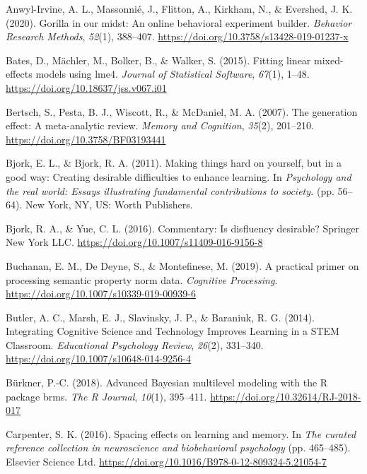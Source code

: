 \documentclass[english,pdf]{apa6}
\begin{document}
\begingroup
\setlength{\parindent}{-0.5in}
\setlength{\leftskip}{0.5in}

\hypertarget{refs}{}
\leavevmode\hypertarget{ref-Anwyl-Irvine2020}{}%
Anwyl-Irvine, A. L., Massonnié, J., Flitton, A., Kirkham, N., \& Evershed, J. K. (2020). Gorilla in our midst: An online behavioral experiment builder. \emph{Behavior Research Methods}, \emph{52}(1), 388--407. \url{https://doi.org/10.3758/s13428-019-01237-x}

\leavevmode\hypertarget{ref-Bates2015}{}%
Bates, D., Mächler, M., Bolker, B., \& Walker, S. (2015). Fitting linear mixed-effects models using lme4. \emph{Journal of Statistical Software}, \emph{67}(1), 1--48. \url{https://doi.org/10.18637/jss.v067.i01}

\leavevmode\hypertarget{ref-Bertsch2007}{}%
Bertsch, S., Pesta, B. J., Wiscott, R., \& McDaniel, M. A. (2007). The generation effect: A meta-analytic review. \emph{Memory and Cognition}, \emph{35}(2), 201--210. \url{https://doi.org/10.3758/BF03193441}

\leavevmode\hypertarget{ref-Bjork2011}{}%
Bjork, E. L., \& Bjork, R. A. (2011). Making things hard on yourself, but in a good way: Creating desirable difficulties to enhance learning. In \emph{Psychology and the real world: Essays illustrating fundamental contributions to society.} (pp. 56--64). New York, NY, US: Worth Publishers.

\leavevmode\hypertarget{ref-Bjork2016}{}%
Bjork, R. A., \& Yue, C. L. (2016). Commentary: Is disfluency desirable? Springer New York LLC. \url{https://doi.org/10.1007/s11409-016-9156-8}

\leavevmode\hypertarget{ref-Buchanan2019}{}%
Buchanan, E. M., De Deyne, S., \& Montefinese, M. (2019). A practical primer on processing semantic property norm data. \emph{Cognitive Processing}. \url{https://doi.org/10.1007/s10339-019-00939-6}

\leavevmode\hypertarget{ref-Butler2014}{}%
Butler, A. C., Marsh, E. J., Slavinsky, J. P., \& Baraniuk, R. G. (2014). Integrating Cognitive Science and Technology Improves Learning in a STEM Classroom. \emph{Educational Psychology Review}, \emph{26}(2), 331--340. \url{https://doi.org/10.1007/s10648-014-9256-4}

\leavevmode\hypertarget{ref-Burkner2018}{}%
Bürkner, P.-C. (2018). Advanced Bayesian multilevel modeling with the R package brms. \emph{The R Journal}, \emph{10}(1), 395--411. \url{https://doi.org/10.32614/RJ-2018-017}

\leavevmode\hypertarget{ref-Carpenter2016}{}%
Carpenter, S. K. (2016). Spacing effects on learning and memory. In \emph{The curated reference collection in neuroscience and biobehavioral psychology} (pp. 465--485). Elsevier Science Ltd. \url{https://doi.org/10.1016/B978-0-12-809324-5.21054-7}
\end{document}
